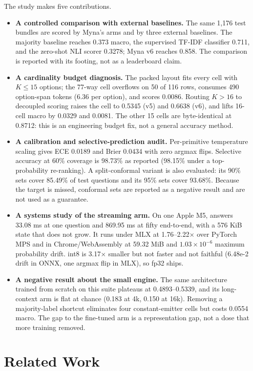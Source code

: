The study makes five contributions.
\begin{itemize}
\item \textbf{A controlled comparison with external baselines.} The same 1{,}176 test bundles are scored by Myna's arms and by three external baselines. The majority baseline reaches 0.373 macro, the supervised TF-IDF classifier 0.711, and the zero-shot NLI scorer 0.3278; Myna v6 reaches 0.858. The comparison is reported with its footing, not as a leaderboard claim.
\item \textbf{A cardinality budget diagnosis.} The packed layout fits every cell with $K\le15$ options; the 77-way cell overflows on 50 of 116 rows, consumes 490 option-span tokens (6.36 per option), and scores 0.0086. Routing $K>16$ to decoupled scoring raises the cell to 0.5345 (v5) and 0.6638 (v6), and lifts 16-cell macro by 0.0329 and 0.0081. The other 15 cells are byte-identical at 0.8712: this is an engineering budget fix, not a general accuracy method.
\item \textbf{A calibration and selective-prediction audit.} Per-primitive temperature scaling gives ECE 0.0189 and Brier 0.0434 with zero argmax flips. Selective accuracy at 60\% coverage is 98.73\% as reported (98.15\% under a top-probability re-ranking). A split-conformal variant is also evaluated: its 90\% sets cover 85.49\% of test questions and its 95\% sets cover 93.68\%. Because the target is missed, conformal sets are reported as a negative result and are not used as a guarantee.
\item \textbf{A systems study of the streaming arm.} On one Apple M5, \stream{} answers 33.08 ms at one question and 869.95 ms at fifty end-to-end, with a 576 KiB state that does not grow. It runs under MLX at 1.76--2.22$\times$ over PyTorch MPS and in Chrome/WebAssembly at 59.32 MiB and $1.03\times10^{-6}$ maximum probability drift. int8 is 3.17$\times$ smaller but not faster and not faithful (6.48e-2 drift in ONNX, one argmax flip in MLX), so fp32 ships.
\item \textbf{A negative result about the small engine.} The same architecture trained from scratch on this suite plateaus at 0.4893--0.5339, and its long-context arm is flat at chance (0.183 at 4k, 0.150 at 16k). Removing a majority-label shortcut eliminates four constant-emitter cells but costs 0.0554 macro. The gap to the fine-tuned arm is a representation gap, not a dose that more training removed.
\end{itemize}

\section{Related Work}
\label{sec:related}

